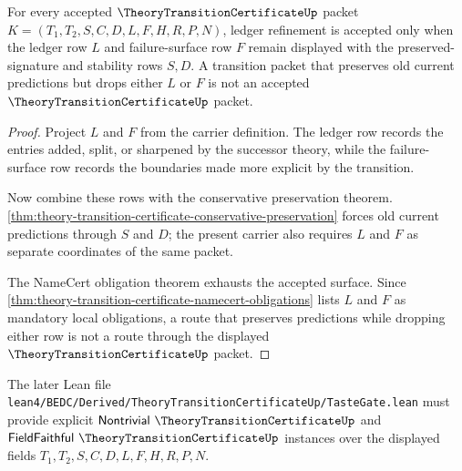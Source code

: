 \begin{theorem}
\label{thm:theory-transition-certificate-ledger-refinement-boundary}
For every accepted $\TheoryTransitionCertificateUp$ packet $K=(T_1,T_2,S,C,D,L,F,H,R,P,N)$, ledger refinement is accepted only when the ledger row $L$ and failure-surface row $F$ remain displayed with the preserved-signature and stability rows $S,D$. A transition packet that preserves old current predictions but drops either $L$ or $F$ is not an accepted $\TheoryTransitionCertificateUp$ packet.
\end{theorem}
\begin{proof}
Project $L$ and $F$ from the carrier definition. The ledger row records the entries added, split, or sharpened by the successor theory, while the failure-surface row records the boundaries made more explicit by the transition.

Now combine these rows with the conservative preservation theorem. \autoref{thm:theory-transition-certificate-conservative-preservation} forces old current predictions through $S$ and $D$; the present carrier also requires $L$ and $F$ as separate coordinates of the same packet.

The NameCert obligation theorem exhausts the accepted surface. Since \autoref{thm:theory-transition-certificate-namecert-obligations} lists $L$ and $F$ as mandatory local obligations, a route that preserves predictions while dropping either row is not a route through the displayed $\TheoryTransitionCertificateUp$ packet.
\end{proof}

The later Lean file \texttt{lean4/BEDC/Derived/TheoryTransitionCertificateUp/TasteGate.lean} must provide explicit $\mathsf{Nontrivial}\ \TheoryTransitionCertificateUp$ and $\mathsf{FieldFaithful}\ \TheoryTransitionCertificateUp$ instances over the displayed fields $T_1,T_2,S,C,D,L,F,H,R,P,N$.



